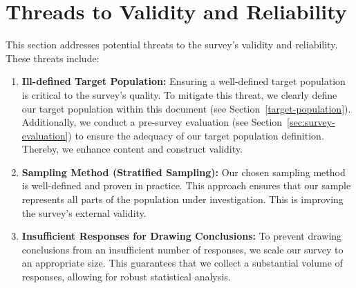 \documentclass[%
class=scrreprt,
chapterprefix=false,%
open=right,%
twoside=false,%
paper=a4,%
logofile={Logo\_zentral\_farbig\_EN.png},%
thesistype=masterproposal,%
UKenglish,%
]{se2thesis}
\begin{document}
\section{Threads to Validity and Reliability} %
This section addresses potential threats to the survey's validity and reliability. These threats include:
\begin{enumerate}
	\item \textbf{Ill-defined Target Population:} Ensuring a well-defined target population is critical to the survey's quality. To mitigate this threat, we clearly define our target population within this document (see Section~\ref{target-population}). Additionally, we conduct a pre-survey evaluation (see Section~\ref{sec:survey-evaluation}) to ensure the adequacy of our target population definition. Thereby, we enhance content and construct validity.
	
	\item \textbf{Sampling Method (Stratified Sampling):} Our chosen sampling method is well-defined and proven in practice. This approach ensures that our sample represents all parts of the population under investigation. This is improving the survey's external validity.
	
	\item \textbf{Insufficient Responses for Drawing Conclusions:} To prevent drawing conclusions from an insufficient number of responses, we scale our survey to an appropriate size. This guarantees that we collect a substantial volume of responses, allowing for robust statistical analysis.
\end{enumerate}
\end{document}
